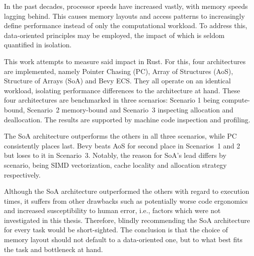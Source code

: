 
\cleardoubleoddpage
\begin{abstract*}
In the past decades, processor speeds have increased vastly, with memory speeds lagging behind. This causes memory layouts and access patterns to increasingly define performance instead of only the computational workload. To address this, data-oriented principles may be employed, the impact of which is seldom quantified in isolation. 

This work attempts to measure said impact in Rust. For this, four architectures are implemented, namely Pointer Chasing (PC), Array of Structures (AoS), Structure of Arrays (SoA) and Bevy ECS. They all operate on an identical workload, isolating performance differences to the architecture at hand. These four architectures are benchmarked in three scenarios: Scenario 1 being compute-bound, Scenario~2 memory-bound and Scenario~3 inspecting allocation and deallocation. The results are supported by machine code inspection and profiling. 

The SoA architecture outperforms the others in all three scenarios, while PC consistently places last. Bevy beats AoS for second place in Scenarios~1 and 2 but loses to it in Scenario~3. Notably, the reason for SoA's lead differs by scenario, being SIMD vectorization, cache locality and allocation strategy respectively. 

Although the SoA architecture outperformed the others with regard to execution times, it suffers from other drawbacks such as potentially worse code ergonomics and increased susceptibility to human error, i.e., factors which were not investigated in this thesis. Therefore, blindly recommending the SoA architecture for every task would be short-sighted. The conclusion is that the choice of memory layout should not default to a data-oriented one, but to what best fits the task and bottleneck at hand. 

\end{abstract*}



